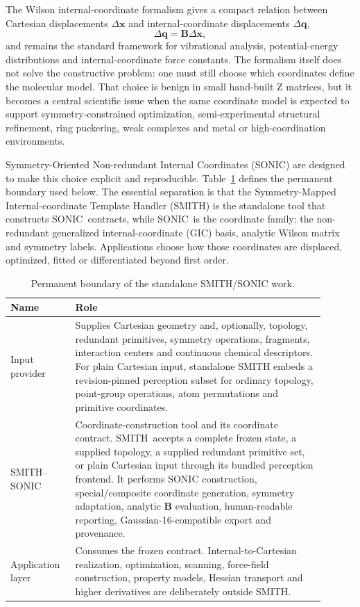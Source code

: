 \documentclass[journal=jctcce,manuscript=article,layout=traditional]{achemso}
\newcommand{\SONIC}{SONIC}
\newcommand{\SMITH}{\textsc{SMITH}}
\newcommand{\Bmat}{\mathbf{B}}
\newcommand{\x}{\mathbf{x}}
\newcommand{\q}{\mathbf{q}}
\theoremstyle{definition}
\begin{document}
The Wilson internal-coordinate formalism gives a compact relation between
Cartesian displacements \(\Delta \x\) and internal-coordinate displacements
\(\Delta \q\),
\begin{equation}
  \Delta \q = \Bmat \Delta \x ,
\end{equation}
and remains the standard framework for vibrational analysis, potential-energy
distributions and internal-coordinate force constants.\cite{Wilson1955}  The
formalism itself does not solve the constructive problem: one must still choose
which coordinates define the molecular model.  That choice is benign in small
hand-built Z matrices, but it becomes a central scientific issue when the same
coordinate model is expected to support symmetry-constrained optimization,
semi-experimental structural refinement, ring puckering, weak complexes and
metal or high-coordination environments.

Symmetry-Oriented Non-redundant Internal Coordinates (SONIC) are designed to
make this choice explicit and reproducible.  Table~\ref{tab:framework-roles}
defines the permanent boundary used below.  The essential separation is that
the Symmetry-Mapped Internal-coordinate Template Handler (\SMITH) is the
standalone tool that constructs \SONIC\ contracts, while
\SONIC\ is the coordinate family: the non-redundant generalized
internal-coordinate (GIC) basis, analytic
Wilson matrix and symmetry labels.  Applications choose how those coordinates
are displaced, optimized, fitted or differentiated beyond first order.

\begin{table}[htbp]
\centering
\caption{Permanent boundary of the standalone SMITH/SONIC work.}
\label{tab:framework-roles}
\begin{tabular}{@{}p{0.18\linewidth}p{0.72\linewidth}@{}}
\toprule
Name & Role \\
\midrule
Input provider & Supplies Cartesian geometry and, optionally, topology,
redundant primitives, symmetry operations, fragments, interaction centers and
continuous chemical descriptors.  For plain Cartesian input, standalone SMITH
embeds a revision-pinned perception subset for ordinary topology, point-group
operations, atom permutations and primitive coordinates. \\
\midrule
\SMITH{}--\SONIC & Coordinate-construction tool and its coordinate
contract.  \SMITH\ accepts a complete frozen state, a supplied topology, a
supplied redundant primitive set, or plain Cartesian input through its bundled
perception frontend.  It performs SONIC construction, special/composite coordinate
generation, symmetry adaptation, analytic \(\Bmat\) evaluation, human-readable
reporting, Gaussian-16-compatible export and provenance. \\
\midrule
Application layer & Consumes the frozen contract.  Internal-to-Cartesian
realization, optimization, scanning, force-field construction, property
models, Hessian transport and higher derivatives are deliberately outside
SMITH. \\
\bottomrule
\end{tabular}
\end{table}
\end{document}
